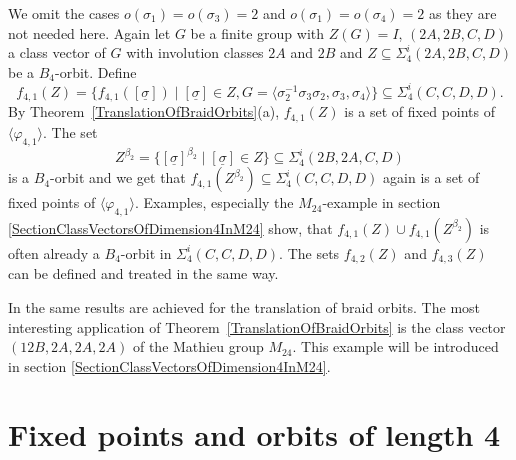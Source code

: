 \documentclass[12pt,a4paper]{article}
\numberwithin{equation}{section}
\numberwithin{table}{section}
\begin{document}
%
\noindent
We omit the cases $o(\sigma_1) = o(\sigma_3) = 2$ and $o(\sigma_1) = o(\sigma_4) = 2$ as they are not needed here.
Again let $G$ be a finite group with $Z(G)=I$, $(2A,2B,C,D)$ a class vector of $G$ with involution classes $2A$ and $2B$
and $Z \subseteq \Sigma^i_4(2A,2B,C,D)$ be a $B_4$-orbit. Define
$$f_{4,1}(Z) = \{ f_{4,1}([\underline{\sigma}]) \mid [\underline{\sigma}] \in Z, 
G=\langle \sigma^{-1}_2 \sigma_3 \sigma_2, \sigma_3, \sigma_4 \rangle \} \subseteq \Sigma^i_4(C,C,D,D).$$
By Theorem~\ref{TranslationOfBraidOrbits}(a), $f_{4,1}(Z)$ is a set of fixed points of $\langle \varphi_{4,1} \rangle$.
The set 
$$Z^{\beta_2} = \{ [\underline{\sigma}]^{\beta_2} \mid [\underline{\sigma}] \in Z \} \subseteq \Sigma^i_4(2B,2A,C,D)$$
is a $B_4$-orbit and we get that
$f_{4,1}(Z^{\beta_2}) \subseteq \Sigma^i_4(C,C,D,D)$ again is a set of fixed points of $\langle \varphi_{4,1} \rangle$.
Examples, especially the $M_{24}$-example in section \ref{SectionClassVectorsOfDimension4InM24} show, 
that $f_{4,1}(Z) \cup  f_{4,1}(Z^{\beta_2})$ is often already a $B_4$-orbit in $\Sigma^i_4(C,C,D,D)$.
The sets $f_{4,2}(Z)$ and $f_{4,3}(Z)$ can be defined and treated in the same way.
\par
\noindent
%
In \cite[III, 5.4]{RefMM2018} the same results are achieved for the translation of braid orbits.
The most interesting application of Theorem~\ref{TranslationOfBraidOrbits}
is the class vector $(12B,2A,2A,2A)$ of the Mathieu group $M_{24}$.
This example will be introduced in section \ref{SectionClassVectorsOfDimension4InM24}.

\section{Fixed points and orbits of length 4}\label{SectionFixedPointsAndOrbitsOfSize4}
\end{document}
